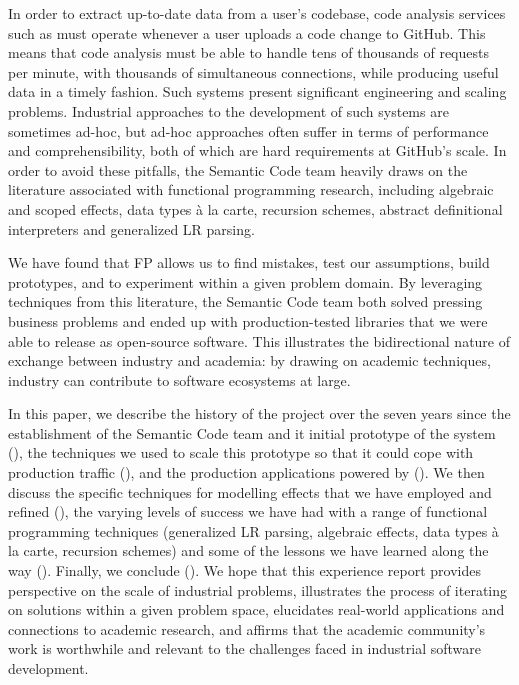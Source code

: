 \documentclass[acmsmall,fleqn]{acmart}
\begin{document}
In order to extract up-to-date data from a user’s codebase, code analysis
services such as \semantic{} must operate whenever a user uploads a code
change to GitHub. This means that code analysis must be able to handle tens
of thousands of requests per minute, with thousands of simultaneous
connections, while producing useful data in a timely fashion. Such systems
present significant engineering and scaling problems. Industrial approaches
to the development of such systems are sometimes ad-hoc, but ad-hoc
approaches often suffer in terms of performance and comprehensibility, both
of which are hard requirements at GitHub’s scale. In order to avoid these
pitfalls, the Semantic Code team heavily draws on the literature associated with
functional programming research, including algebraic and scoped effects,
data types \`a la carte, recursion schemes, abstract definitional interpreters
and generalized LR parsing.

We have found that FP allows us to find
mistakes, test our assumptions, build prototypes, and to experiment within a
given problem domain. By leveraging techniques from this literature, the
Semantic Code team both solved pressing business problems and ended up with
production-tested libraries that we were able to release as open-source
software. This illustrates the bidirectional nature of exchange between
industry and academia: by drawing on academic techniques, industry can
contribute to software ecosystems at large.

In this paper, we describe the history of the \semantic{} project over the
seven years since the establishment of the Semantic Code team
and it initial prototype of the system (),
the techniques we used to scale this prototype so that
it could cope with production traffic (), and the
production applications powered by \semantic{} ().
We then discuss the specific techniques for modelling effects that we have employed and refined
(), the varying levels of success
we have had with a range of functional programming techniques
(generalized LR parsing, algebraic effects, data types \`{a} la carte, recursion schemes)
and some of the lessons we have learned along the way
().
Finally, we conclude ().
We hope that this experience report
provides perspective on the scale of industrial problems, illustrates the
process of iterating on solutions within a given problem space, elucidates
real-world applications and connections to academic research, and affirms
that the academic community’s work is worthwhile and relevant to the
challenges faced in industrial software development.
\end{document}
